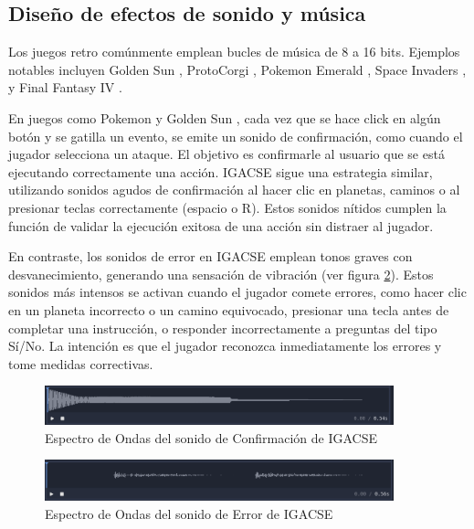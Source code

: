\subsection{Diseño de efectos de sonido y música}

Los juegos retro comúnmente emplean bucles de música de 8 a 16 bits. Ejemplos notables incluyen Golden Sun \cite{Wiki_Golden_Sun}, ProtoCorgi \cite{ProtoCorgi}, Pokemon Emerald \cite{PokemonEmerald}, Space Invaders \cite{SpaceInvaders}, y Final Fantasy IV \cite{FinalFantasyIV}.

En juegos como Pokemon \cite{PokemonEmerald} y Golden Sun \cite{Wiki_Golden_Sun}, cada vez que se hace click en algún botón y se gatilla un evento, se emite un sonido de confirmación, como cuando el jugador selecciona un ataque. El objetivo es confirmarle al usuario que se está ejecutando correctamente una acción. IGACSE sigue una estrategia similar, utilizando sonidos agudos de confirmación al hacer clic en planetas, caminos o al presionar teclas correctamente (espacio o R). Estos sonidos nítidos cumplen la función de validar la ejecución exitosa de una acción sin distraer al jugador.

En contraste, los sonidos de error en IGACSE emplean tonos graves con desvanecimiento, generando una sensación de vibración (ver figura \ref{EspectroOndasSonidoError}). Estos sonidos más intensos se activan cuando el jugador comete errores, como hacer clic en un planeta incorrecto o un camino equivocado, presionar una tecla antes de completar una instrucción, o responder incorrectamente a preguntas del tipo Sí/No. La intención es que el jugador reconozca inmediatamente los errores y tome medidas correctivas.

\begin{figure}[h]
	\centering
	\includegraphics[width=0.9\textwidth]{imagenes/EspectroOndasConfirmacion.png}
	\caption{Espectro de Ondas del sonido de Confirmación de IGACSE}
	\label{EspectroOndasSonidoConfirmacion}
\end{figure}


\begin{figure}[h]
	\centering
	\includegraphics[width=0.9\textwidth]{imagenes/EspectroOndasError.png}
	\caption{Espectro de Ondas del sonido de Error de IGACSE}
	\label{EspectroOndasSonidoError}
\end{figure}


